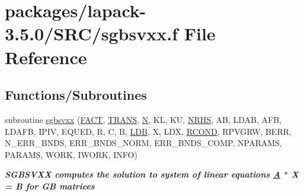 \hypertarget{sgbsvxx_8f}{}\section{packages/lapack-\/3.5.0/\+S\+R\+C/sgbsvxx.f File Reference}
\label{sgbsvxx_8f}
\subsection*{Functions/\+Subroutines}
\begin{DoxyCompactItemize}
\item 
subroutine \hyperlink{group__realGBsolve_gab7b2d018021516f6f0b0f4f6199f32ae}{sgbsvxx} (\hyperlink{superlu__enum__consts_8h_af00a42ecad444bbda75cde1b64bd7e72a1b6692b56d378abb85bd49063721d034}{F\+A\+C\+T}, \hyperlink{superlu__enum__consts_8h_a0c4e17b2d5cea33f9991ccc6a6678d62a1f61e3015bfe0f0c2c3fda4c5a0cdf58}{T\+R\+A\+N\+S}, \hyperlink{polmisc_8c_a0240ac851181b84ac374872dc5434ee4}{N}, K\+L, K\+U, \hyperlink{example__user_8c_aa0138da002ce2a90360df2f521eb3198}{N\+R\+H\+S}, A\+B, L\+D\+A\+B, A\+F\+B, L\+D\+A\+F\+B, I\+P\+I\+V, E\+Q\+U\+E\+D, R, C, B, \hyperlink{example__user_8c_a50e90a7104df172b5a89a06c47fcca04}{L\+D\+B}, X, L\+D\+X, \hyperlink{superlu__enum__consts_8h_af00a42ecad444bbda75cde1b64bd7e72a9b5c151728d8512307565994c89919d5}{R\+C\+O\+N\+D}, R\+P\+V\+G\+R\+W, B\+E\+R\+R, N\+\_\+\+E\+R\+R\+\_\+\+B\+N\+D\+S, E\+R\+R\+\_\+\+B\+N\+D\+S\+\_\+\+N\+O\+R\+M, E\+R\+R\+\_\+\+B\+N\+D\+S\+\_\+\+C\+O\+M\+P, N\+P\+A\+R\+A\+M\+S, P\+A\+R\+A\+M\+S, W\+O\+R\+K, I\+W\+O\+R\+K, I\+N\+F\+O)
\begin{DoxyCompactList}\small\item\em {\bfseries  S\+G\+B\+S\+V\+X\+X computes the solution to system of linear equations \hyperlink{classA}{A} $\ast$ X = B for G\+B matrices} \end{DoxyCompactList}\end{DoxyCompactItemize}
